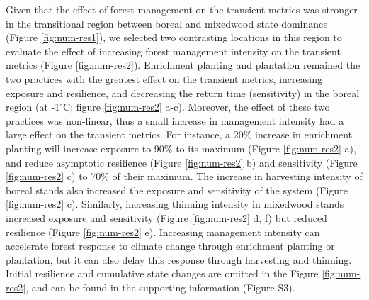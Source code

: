 \documentclass[12pt]{article}
\begin{document}
Given that the effect of forest management on the transient metrics was
stronger in the transitional region between boreal and mixedwood state
dominance (Figure \ref{fig:num-res1}), we selected two contrasting
locations in this region to evaluate the effect of increasing forest
management intensity on the transient metrics (Figure
\ref{fig:num-res2}). Enrichment planting and plantation remained the two
practices with the greatest effect on the transient metrics, increasing
exposure and resilience, and decreasing the return time (sensitivity) in
the boreal region (at -1\(^{\circ}\)C; figure \ref{fig:num-res2} a-c).
Moreover, the effect of these two practices was non-linear, thus a small
increase in management intensity had a large effect on the transient
metrics. For instance, a 20\% increase in enrichment planting will
increase exposure to 90\% to its maximum (Figure \ref{fig:num-res2} a),
and reduce asymptotic resilience (Figure \ref{fig:num-res2} b) and
sensitivity (Figure \ref{fig:num-res2} c) to 70\% of their maximum. The
increase in harvesting intensity of boreal stands also increased the
exposure and sensitivity of the system (Figure \ref{fig:num-res2} c).
Similarly, increasing thinning intensity in mixedwood stands increased
exposure and sensitivity (Figure \ref{fig:num-res2} d, f) but reduced
resilience (Figure \ref{fig:num-res2} e). Increasing management
intensity can accelerate forest response to climate change through
enrichment planting or plantation, but it can also delay this response
through harvesting and thinning. Initial resilience and cumulative state
changes are omitted in the Figure \ref{fig:num-res2}, and can be found
in the supporting information (Figure S3).
\end{document}
